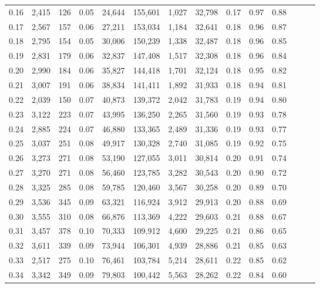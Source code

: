 \begin{tabular}{rrrrrrrrrrrrrr}
0.16 &  2,415 &  126 &  0.05 &   24,644 &  155,601 &   1,027 &  32,798 &  0.17 &  0.97 &      0.88 \\
0.17 &  2,567 &  157 &  0.06 &   27,211 &  153,034 &   1,184 &  32,641 &  0.18 &  0.96 &      0.87 \\
0.18 &  2,795 &  154 &  0.05 &   30,006 &  150,239 &   1,338 &  32,487 &  0.18 &  0.96 &      0.85 \\
0.19 &  2,831 &  179 &  0.06 &   32,837 &  147,408 &   1,517 &  32,308 &  0.18 &  0.96 &      0.84 \\
0.20 &  2,990 &  184 &  0.06 &   35,827 &  144,418 &   1,701 &  32,124 &  0.18 &  0.95 &      0.82 \\
0.21 &  3,007 &  191 &  0.06 &   38,834 &  141,411 &   1,892 &  31,933 &  0.18 &  0.94 &      0.81 \\
0.22 &  2,039 &  150 &  0.07 &   40,873 &  139,372 &   2,042 &  31,783 &  0.19 &  0.94 &      0.80 \\
0.23 &  3,122 &  223 &  0.07 &   43,995 &  136,250 &   2,265 &  31,560 &  0.19 &  0.93 &      0.78 \\
0.24 &  2,885 &  224 &  0.07 &   46,880 &  133,365 &   2,489 &  31,336 &  0.19 &  0.93 &      0.77 \\
0.25 &  3,037 &  251 &  0.08 &   49,917 &  130,328 &   2,740 &  31,085 &  0.19 &  0.92 &      0.75 \\
0.26 &  3,273 &  271 &  0.08 &   53,190 &  127,055 &   3,011 &  30,814 &  0.20 &  0.91 &      0.74 \\
0.27 &  3,270 &  271 &  0.08 &   56,460 &  123,785 &   3,282 &  30,543 &  0.20 &  0.90 &      0.72 \\
0.28 &  3,325 &  285 &  0.08 &   59,785 &  120,460 &   3,567 &  30,258 &  0.20 &  0.89 &      0.70 \\
0.29 &  3,536 &  345 &  0.09 &   63,321 &  116,924 &   3,912 &  29,913 &  0.20 &  0.88 &      0.69 \\
0.30 &  3,555 &  310 &  0.08 &   66,876 &  113,369 &   4,222 &  29,603 &  0.21 &  0.88 &      0.67 \\
0.31 &  3,457 &  378 &  0.10 &   70,333 &  109,912 &   4,600 &  29,225 &  0.21 &  0.86 &      0.65 \\
0.32 &  3,611 &  339 &  0.09 &   73,944 &  106,301 &   4,939 &  28,886 &  0.21 &  0.85 &      0.63 \\
0.33 &  2,517 &  275 &  0.10 &   76,461 &  103,784 &   5,214 &  28,611 &  0.22 &  0.85 &      0.62 \\
0.34 &  3,342 &  349 &  0.09 &   79,803 &  100,442 &   5,563 &  28,262 &  0.22 &  0.84 &      0.60 \\

\end{tabular}
